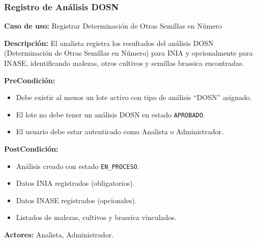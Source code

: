 \subsubsection{Registro de Análisis DOSN}

\noindent\textbf{Caso de uso:} Registrar Determinación de Otras Semillas en Número

\vspace{0.5em}
\noindent\textbf{Descripción:} El analista registra los resultados del análisis DOSN (Determinación de Otras Semillas en Número) para INIA y opcionalmente para INASE, identificando malezas, otros cultivos y semillas brassica encontradas.

\vspace{0.5em}
\noindent\textbf{PreCondición:}
\begin{itemize}[nosep]
    \item Debe existir al menos un lote activo con tipo de análisis ``DOSN'' asignado.
    \item El lote no debe tener un análisis DOSN en estado \texttt{APROBADO}.
    \item El usuario debe estar autenticado como Analista o Administrador.
\end{itemize}

\vspace{0.5em}
\noindent\textbf{PostCondición:}
\begin{itemize}[nosep]
    \item Análisis creado con estado \texttt{EN\_PROCESO}.
    \item Datos INIA registrados (obligatorios).
    \item Datos INASE registrados (opcionales).
    \item Listados de malezas, cultivos y brassica vinculados.
\end{itemize}

\vspace{0.5em}
\noindent\textbf{Actores:} Analista, Administrador.

